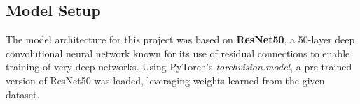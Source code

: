 
\subsection{Model Setup}
The model architecture for this project was based on \textbf{ResNet50}, a 50-layer deep 
convolutional neural network known for its use of residual connections to enable training of very 
deep networks. Using PyTorch’s \textit{torchvision.model}, a pre-trained version of ResNet50 was 
loaded, leveraging weights learned from the given dataset.

